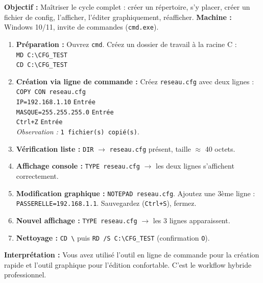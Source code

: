 \documentclass[11pt]{article}
\begin{document}
\begin{experience}
\textbf{Objectif :} Maîtriser le cycle complet : créer un répertoire, s'y placer, créer un fichier de config, l'afficher, l'éditer graphiquement, réafficher.
\textbf{Machine :} Windows 10/11, invite de commandes (\texttt{cmd.exe}).

\begin{enumerate}
    \item \textbf{Préparation :} Ouvrez \texttt{cmd}. Créez un dossier de travail à la racine C :\\
    \texttt{MD C:\textbackslash{}CFG\_TEST} \\
    \texttt{CD C:\textbackslash{}CFG\_TEST}
    \item \textbf{Création via ligne de commande :} Créez \texttt{reseau.cfg} avec deux lignes :\\
    \texttt{COPY CON reseau.cfg} \\
    \texttt{IP=192.168.1.10} \texttt{Entrée} \\
    \texttt{MASQUE=255.255.255.0} \texttt{Entrée} \\
    \texttt{Ctrl+Z} \texttt{Entrée} \\
    \textit{Observation :} \texttt{1 fichier(s) copié(s)}.
    \item \textbf{Vérification liste :} \texttt{DIR} $\to$ \texttt{reseau.cfg} présent, taille $\approx$ 40 octets.
    \item \textbf{Affichage console :} \texttt{TYPE reseau.cfg} $\to$ les deux lignes s'affichent correctement.
    \item \textbf{Modification graphique :} \texttt{NOTEPAD reseau.cfg}. Ajoutez une 3ème ligne : \texttt{PASSERELLE=192.168.1.1}. Sauvegardez (\texttt{Ctrl+S}), fermez.
    \item \textbf{Nouvel affichage :} \texttt{TYPE reseau.cfg} $\to$ les 3 lignes apparaissent.
    \item \textbf{Nettoyage :} \texttt{CD \textbackslash{}} puis \texttt{RD /S C:\textbackslash{}CFG\_TEST} (confirmation \texttt{O}).
\end{enumerate}
\textbf{Interprétation :} Vous avez utilisé l'outil en ligne de commande pour la création rapide et l'outil graphique pour l'édition confortable. C'est le workflow hybride professionnel.
\end{experience}
\end{document}
